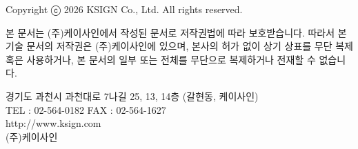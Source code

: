 \clearpage
\thispagestyle{fancy}

\vspace*{3cm}

\vfill

{\footnotesize
\noindent
\begin{minipage}{0.58\textwidth}
Copyright ⓒ 2026 KSIGN Co., Ltd. All rights reserved.

본 문서는 (주)케이사인에서 작성된 문서로 저작권법에 따라 보호받습니다. 따라서 본 기술 문서의 저작권은 (주)케이사인에 있으며, 본사의 허가 없이 상기 상표를 무단 복제 혹은 사용하거나, 본 문서의 일부 또는 전체를 무단으로 복제하거나 전재할 수 없습니다.

\vspace{0.8em}

경기도 과천시 과천대로 7나길 25, 13, 14층 (갈현동, 케이사인)\\
TEL : 02-564-0182 \quad FAX : 02-564-1627\\
http://www.ksign.com\\
(주)케이사인
\end{minipage}
}


\vspace{10mm}
